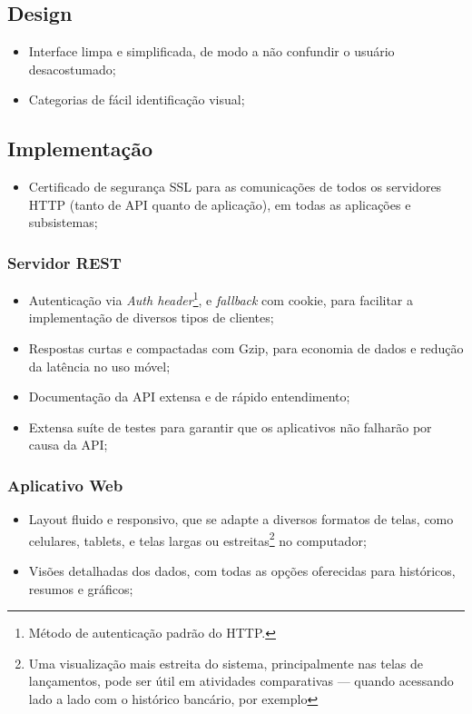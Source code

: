 \documentclass[a4paper]{abnt}
\begin{document}
\subsection{Design}
\begin{itemize} 
	\item Interface limpa e simplificada, de modo a não confundir o usuário desacostumado;
	\item Categorias de fácil identificação visual;
\end{itemize}

\subsection{Implementação}
\begin{itemize} 
	\item Certificado de segurança SSL para as comunicações de todos os servidores HTTP (tanto de API quanto de aplicação), em todas as aplicações e subsistemas;
\end{itemize}

\subsubsection{Servidor REST}
\begin{itemize} 
	\item Autenticação via \emph{Auth header}\footnote{Método de autenticação padrão do HTTP.}, e \emph{fallback} com cookie, para facilitar a implementação de diversos tipos de clientes\cite{auth};
	\item Respostas curtas e compactadas com Gzip, para economia de dados e redução da latência no uso móvel;
	\item Documentação da API extensa e de rápido entendimento;
	\item Extensa suíte de testes para garantir que os aplicativos não falharão por causa da API;
\end{itemize}

\subsubsection{Aplicativo Web}
\begin{itemize}
	\item Layout fluido e responsivo, que se adapte a diversos formatos de telas, como celulares, tablets, e telas largas ou estreitas\footnote{Uma visualização mais estreita do sistema, principalmente nas telas de lançamentos, pode ser útil em atividades comparativas --- quando acessando lado a lado com o histórico bancário, por exemplo} no computador;
	\item Vis\~oes detalhadas dos dados, com todas as opç\~oes oferecidas para históricos, resumos e gráficos;
\end{itemize}
\end{document}
